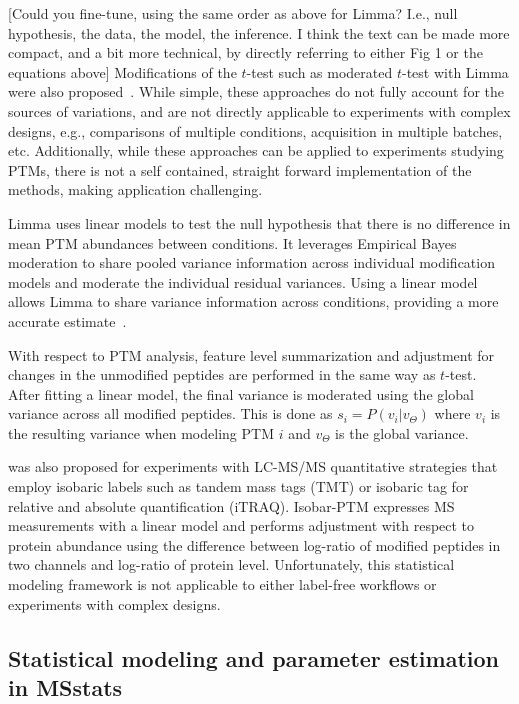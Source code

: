 \documentclass[mcp]{article}
\numberwithin{table}{section}
\def\todo#1{{\color{red}[#1]}}
\begin{document}
\medskip {} \todo{Could you fine-tune, using the same order as above for Limma? I.e., null hypothesis, the data, the model, the inference. I think the text can be made more compact, and a bit more technical, by directly referring to either Fig 1 or the equations above} Modifications of the $t$-test such as moderated $t$-test with Limma were also proposed~\cite{Ritchie_15a}\cite{Zhu}. While simple, these approaches do not fully account for the sources of variations, and are not directly applicable to experiments with complex designs, e.g., comparisons of multiple conditions, acquisition in multiple batches, etc. Additionally, while these approaches can be applied to experiments studying PTMs, there is not a self contained, straight forward implementation of the methods, making application challenging. 

Limma uses linear models to test the null hypothesis that there is no difference in mean PTM abundances between conditions. It leverages Empirical Bayes moderation to share pooled variance information across individual modification models and moderate the individual residual variances. Using a linear model allows Limma to share variance information across conditions, providing a more accurate estimate~\cite{Ritchie_15a}.

With respect to PTM analysis, feature level summarization and adjustment for changes in the unmodified peptides are performed in the same way as $t$-test. After fitting a linear model, the final variance is moderated using the global variance across all modified peptides. This is done as $s_{i} = P(v_i| v_\Theta)$ where $v_i$ is the resulting variance when modeling PTM $i$ and $v_\Theta$ is the global variance.

\medskip {} was also proposed for experiments with LC-MS/MS quantitative strategies that employ isobaric labels such as tandem mass tags (TMT) or isobaric tag for relative and absolute quantification (iTRAQ)\cite{Breitwieser:2013}. Isobar-PTM expresses MS measurements with a linear model and performs adjustment with respect to protein abundance using the difference between log-ratio of modified peptides in two channels and log-ratio of protein level. Unfortunately, this statistical modeling framework is not applicable to either label-free workflows or experiments with complex designs. 


\subsection*{Statistical modeling and parameter estimation in MSstats}
\end{document}
